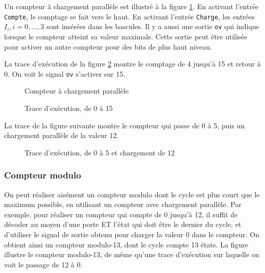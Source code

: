 \documentclass[11pt]{article}
\begin{document}
Un compteur à chargement parallèle est illustré à la figure
\ref{fig:org59aae99}. En activant l'entrée \texttt{Compte}, le comptage
se fait vers le haut. En activant l'entrée \texttt{Charge}, les entrées \(I_i, i=0, \ldots, 3\) sont insérées dans les bascules. Il y a aussi une
sortie \texttt{ov} qui indique lorsque le compteur atteint sa valeur
maximale. Cette sortie peut être utilisée pour activer un autre
compteur pour des bits de plus haut niveau.

La trace d'exécution de la figure \ref{fig:orgbbdc90e}
montre le comptage de 4 jusqu'à 15 et retour à 0. On voit le signal
\texttt{ov} s'activer sur 15. 

\begin{figure}[htbp]
\centering

\caption{\label{fig:org59aae99}Compteur à chargement parallèle}
\end{figure}

\begin{figure}[htbp]
\centering

\caption{\label{fig:orgbbdc90e}Trace d'exécution, de 0 à 15}
\end{figure}

La trace de la figure suivante montre le compteur qui
passe de 0 à 5, puis un chargement parallèle de la valeur 12.

\begin{figure}[htbp]
\centering

\caption{\label{fig:orgd3465eb}Trace d'exécution, de 0 à 5 et chargement de 12}
\end{figure}

\subsubsection{Compteur modulo}
\label{sec:orgaf5cd1d}

On peut réaliser aisément un compteur modulo dont le cycle est plus
court que le maximum possible, en utilisant un compteur avec
chargement parallèle.  Par exemple, pour réaliser un compteur qui
compte de 0 jusqu'à 12, il suffit de décoder au moyen d'une porte ET
l'état qui doit être le dernier du cycle, et d'utiliser le signal de
sortie obtenu pour charger la valeur 0 dans le compteur. On obtient
ainsi un compteur modulo-13, dont le cycle compte 13 états.  La figure
illustre le compteur modulo-13, de même qu'une trace d'exécution sur
laquelle on voit le passage de 12 à 0.
\end{document}
